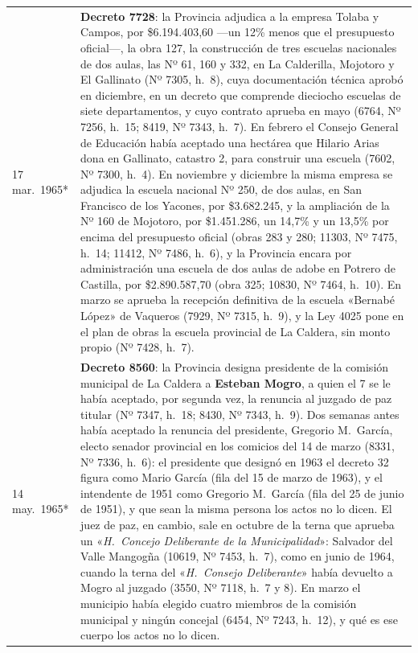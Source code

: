 \begin{longtable}{@{}p{2.7cm}p{10.3cm}@{}}
17 mar.\ 1965* & \textbf{Decreto 7728}: la Provincia adjudica a la empresa Tolaba y Campos, por \$6.194.403,60 ---un 12\% menos que el presupuesto oficial---, la obra 127, la construcción de tres escuelas nacionales de dos aulas, las Nº 61, 160 y 332, en La Calderilla, Mojotoro y El Gallinato (Nº 7305, h.\ 8), cuya documentación técnica aprobó en diciembre, en un decreto que comprende dieciocho escuelas de siete departamentos, y cuyo contrato aprueba en mayo (6764, Nº 7256, h.\ 15; 8419, Nº 7343, h.\ 7). En febrero el Consejo General de Educación había aceptado una hectárea que Hilario Arias dona en Gallinato, catastro 2, para construir una escuela (7602, Nº 7300, h.\ 4). En noviembre y diciembre la misma empresa se adjudica la escuela nacional Nº 250, de dos aulas, en San Francisco de los Yacones, por \$3.682.245, y la ampliación de la Nº 160 de Mojotoro, por \$1.451.286, un 14,7\% y un 13,5\% por encima del presupuesto oficial (obras 283 y 280; 11303, Nº 7475, h.\ 14; 11412, Nº 7486, h.\ 6), y la Provincia encara por administración una escuela de dos aulas de adobe en Potrero de Castilla, por \$2.890.587,70 (obra 325; 10830, Nº 7464, h.\ 10). En marzo se aprueba la recepción definitiva de la escuela «Bernabé López» de Vaqueros (7929, Nº 7315, h.\ 9), y la Ley 4025 pone en el plan de obras la escuela provincial de La Caldera, sin monto propio (Nº 7428, h.\ 7). \\
14 may.\ 1965* & \textbf{Decreto 8560}: la Provincia designa presidente de la comisión municipal de La Caldera a \textbf{Esteban Mogro}\index{Mogro, Esteban}, a quien el 7 se le había aceptado, por segunda vez, la renuncia al juzgado de paz titular (Nº 7347, h.\ 18; 8430, Nº 7343, h.\ 9). Dos semanas antes había aceptado la renuncia del presidente, Gregorio M.\ García, electo senador provincial en los comicios del 14 de marzo (8331, Nº 7336, h.\ 6): el presidente que designó en 1963 el decreto 32 figura como Mario García (fila del 15 de marzo de 1963), y el intendente de 1951 como Gregorio M.\ García (fila del 25 de junio de 1951), y que sean la misma persona los actos no lo dicen. El juez de paz, en cambio, sale en octubre de la terna que aprueba un «\textit{H.\ Concejo Deliberante de la Municipalidad}»: Salvador del Valle Mangogña (10619, Nº 7453, h.\ 7), como en junio de 1964, cuando la terna del «\textit{H.\ Consejo Deliberante}» había devuelto a Mogro al juzgado (3550, Nº 7118, h.\ 7 y 8). En marzo el municipio había elegido cuatro miembros de la comisión municipal y ningún concejal (6454, Nº 7243, h.\ 12), y qué es ese cuerpo los actos no lo dicen. \\

\end{longtable}
